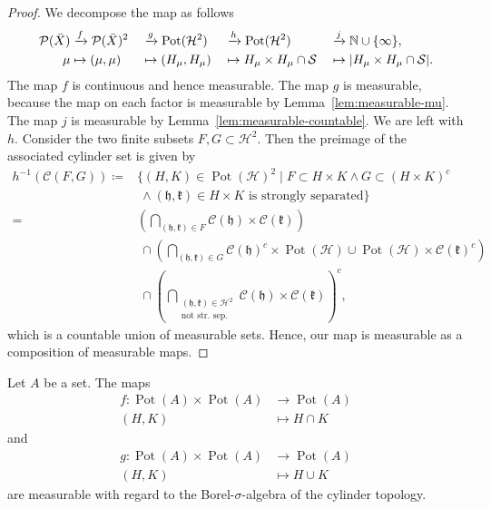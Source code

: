 \begin{proof}
  We decompose the map as follows
  \begin{alignat*}{4}
    \mathcal{P}(\bar X) &\xrightarrow{f} \mathcal{P}(\bar X)^2&&\xrightarrow{g} \operatorname{Pot}(\mathcal{H}^2) &&\xrightarrow{h} \operatorname{Pot}(\mathcal{H}^2) &&\xrightarrow{j} \mathbb{N} \cup \{\infty\},\\
    \mu &\mapsto (\mu, \mu) &&\mapsto (H_\mu, H_\mu)&&\mapsto H_\mu \times H_\mu \cap \mathcal{S} &&\mapsto |H_\mu \times H_\mu \cap \mathcal{S}|.
  \end{alignat*}
  The map \(f\) is continuous and hence measurable. The map \(g\) is measurable, because the map on each factor is measurable by Lemma~\ref{lem:measurable-mu}. The map \(j\) is measurable by Lemma~\ref{lem:measurable-countable}. We are left with \(h\). Consider the two finite subsets \(F, G \subset \mathcal{H}^2\). Then the preimage of the associated cylinder set is given by
  \begin{align*}
    h^{-1}(\mathcal{C}(F,G)) \coloneqq & \{(H, K) \in \operatorname{Pot}(\mathcal{H})^2 \mid F \subset H \times K \wedge G \subset (H \times K)^c\\
    &\ \wedge (\mathfrak{h}, \mathfrak{k}) \in H \times K \text{ is strongly separated}\}\\
    = & \left (\bigcap_{(\mathfrak{h},\mathfrak{k}) \in F} \mathcal{C}(\mathfrak{h}) \times \mathcal{C}(\mathfrak{k})\right)\\
      &\ \cap \left (\bigcap_{(\mathfrak{h},\mathfrak{k}) \in G} \mathcal{C}(\mathfrak{h})^c \times \operatorname{Pot}(\mathcal{H}) \cup \operatorname{Pot}(\mathcal{H}) \times \mathcal{C}(\mathfrak{k})^c \right)\\
      &\ \cap \left( \bigcap_{\substack{(\mathfrak{h}, \mathfrak{k}) \in \mathcal{H}^2\\\text{not str.\ sep.}}} \mathcal{C}(\mathfrak{h}) \times \mathcal{C}(\mathfrak{k})\right)^c,
  \end{align*}
  which is a countable union of measurable sets. Hence, our map is measurable as a composition of measurable maps.
\end{proof}

\begin{lemma}
  Let \(A\) be a set. The maps
  \begin{align*}
    f \colon \operatorname{Pot}(A) \times \operatorname{Pot}(A) & \to \operatorname{Pot}(A)\\
    (H, K) & \mapsto H \cap K
  \end{align*}
  and
  \begin{align*}
    g \colon \operatorname{Pot}(A) \times \operatorname{Pot}(A) & \to \operatorname{Pot}(A)\\
    (H, K) & \mapsto H \cup K
  \end{align*}
  are measurable with regard to the Borel-\(\sigma\)-algebra of the cylinder topology.
\end{lemma}

